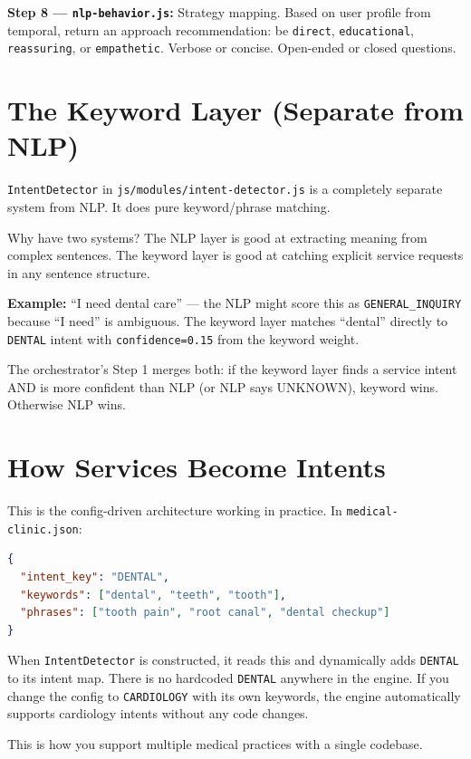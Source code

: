 \documentclass[12pt, a4paper]{report}
\newcommand{\ic}[1]{\texttt{\small\color{accentblue!70!black}#1}}
\begin{document}
\textbf{Step 8 --- \ic{nlp-behavior.js}:} Strategy mapping. Based on user profile from
temporal, return an approach recommendation: be \ic{direct}, \ic{educational},
\ic{reassuring}, or \ic{empathetic}. Verbose or concise. Open-ended or closed questions.

\section{The Keyword Layer (Separate from NLP)}

\ic{IntentDetector} in \ic{js/modules/intent-detector.js} is a completely separate
system from NLP. It does pure keyword/phrase matching.

Why have two systems? The NLP layer is good at extracting meaning from complex sentences.
The keyword layer is good at catching explicit service requests in any sentence structure.

\textbf{Example:} ``I need dental care'' --- the NLP might score this as
\ic{GENERAL\_INQUIRY} because ``I need'' is ambiguous. The keyword layer matches
``dental'' directly to \ic{DENTAL} intent with \ic{confidence=0.15} from the keyword
weight.

The orchestrator's Step 1 merges both: if the keyword layer finds a service intent AND
is more confident than NLP (or NLP says UNKNOWN), keyword wins. Otherwise NLP wins.

\section{How Services Become Intents}

This is the config-driven architecture working in practice. In
\ic{medical-clinic.json}:

\begin{lstlisting}[language=json]
{
  "intent_key": "DENTAL",
  "keywords": ["dental", "teeth", "tooth"],
  "phrases": ["tooth pain", "root canal", "dental checkup"]
}
\end{lstlisting}

When \ic{IntentDetector} is constructed, it reads this and dynamically adds \ic{DENTAL}
to its intent map. There is no hardcoded \ic{DENTAL} anywhere in the engine. If you
change the config to \ic{CARDIOLOGY} with its own keywords, the engine automatically
supports cardiology intents without any code changes.

This is how you support multiple medical practices with a single codebase.

\end{document}

